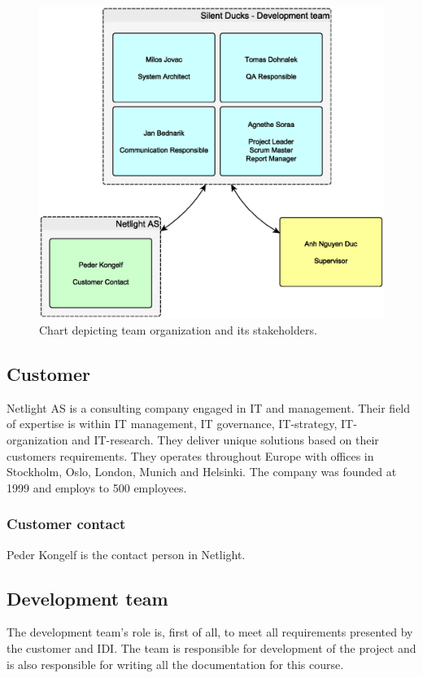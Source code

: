 \begin{figure}[!ht]
    \begin{center}
    \includegraphics[width=12cm]{images/organization_chart.eps}
    \caption{Chart depicting team organization and its stakeholders.}
    \label{img:organization_chart}
    \end{center}
\end{figure}

\subsection{Customer}
Netlight AS is a consulting company engaged in IT and management. Their field of expertise is within IT management, IT governance, IT-strategy, IT-organization and IT-research. They deliver unique solutions based on their customers requirements. They operates throughout Europe with offices in Stockholm, Oslo, London, Munich and Helsinki. The company was founded at 1999 and employs to 500 employees. 
\subsubsection{Customer contact}
Peder Kongelf is the contact person in Netlight.

\subsection{Development team}
The development team's role is, first of all, to meet all requirements presented by the customer and IDI. 
The team is responsible for development of the project and is also responsible for writing all the documentation for this course.  

